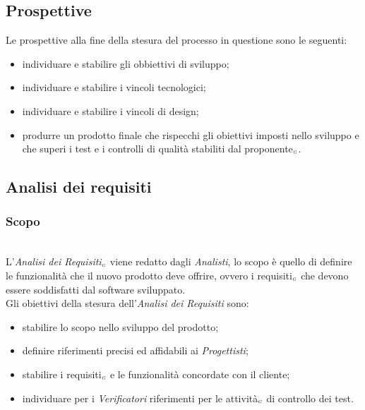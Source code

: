 \subsection{Prospettive}\label{ProcessiPrimariProspettive}
Le prospettive alla fine della stesura del processo in questione sono le seguenti:
\begin{itemize}
	\item individuare e stabilire gli obbiettivi di sviluppo;
	\item individuare e stabilire i vincoli tecnologici;
	\item individuare e stabilire i vincoli di design;
	\item produrre un prodotto finale che rispecchi gli obiettivi imposti nello sviluppo e che superi i test e i controlli di qualità stabiliti dal proponente$_{\scaleto{G}{3pt}}$.
\end{itemize}
\subsection{Analisi dei requisiti}\label{ProcessiPrimariProspettiveAnalisiDeiRequisiti}
\subsubsection{Scopo}\label{ProcessiPrimariProspettiveAnalisiDeiRequisitiScopo}\mbox{}\\
L'\textit{Analisi dei Requisiti$_{\scaleto{G}{3pt}}$} viene redatto dagli \textit{Analisti}, lo scopo è quello di definire le funzionalità che il nuovo prodotto deve offrire, ovvero i requisiti$_{\scaleto{G}{3pt}}$ che devono essere soddisfatti dal software sviluppato.\\
Gli obiettivi della stesura dell'\textit{Analisi dei Requisiti} sono:
\begin{itemize}
	\item stabilire lo scopo nello sviluppo del prodotto;
	\item definire riferimenti precisi ed affidabili ai \textit{Progettisti};
	\item stabilire i requisiti$_{\scaleto{G}{3pt}}$ e le funzionalità concordate con il cliente;
	\item individuare per i \textit{Verificatori} riferimenti per le attività$_{\scaleto{G}{3pt}}$ di controllo dei test.
\end{itemize}
